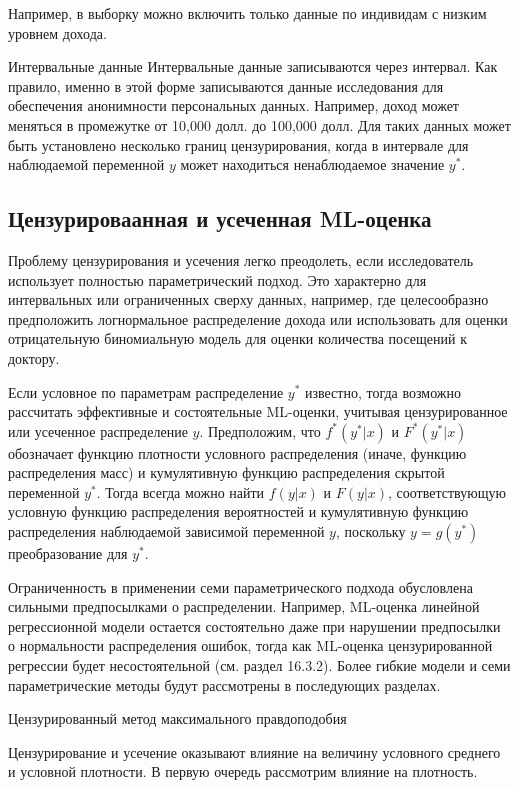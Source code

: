 Например, в выборку можно включить только данные по индивидам с низким уровнем дохода.

Интервальные данные
Интервальные данные записываются через интервал. Как правило, именно в этой форме записываются данные исследования для обеспечения анонимности персональных данных. Например, доход может меняться в промежутке от 10,000 долл. до 100,000 долл. Для таких данных может быть установлено несколько границ цензурирования, когда в интервале для наблюдаемой переменной $y$ может находиться ненаблюдаемое значение $y^{*}$. 

\subsection{Цензурироваанная и усеченная ML-оценка}

Проблему цензурирования и усечения легко преодолеть, если исследователь использует полностью параметрический подход. Это характерно для интервальных или ограниченных сверху данных, например, где целесообразно предположить логнормальное распределение дохода или использовать для оценки отрицательную биномиальную модель для оценки количества посещений к доктору.

Если условное по параметрам распределение $y^{*}$ известно, тогда возможно рассчитать эффективные и состоятельные ML-оценки, учитывая цензурированное или усеченное распределение $y$. Предположим, что $f^{*}(y^{*}|x)$ и $F^{*}(y^{*}|x)$ обозначает функцию плотности условного распределения (иначе, функцию распределения масс) и кумулятивную функцию распределения скрытой переменной $y^{*}$. Тогда всегда можно найти $f(y|x)$ и $F(y|x)$, соответствующую условную функцию распределения вероятностей и кумулятивную функцию распределения наблюдаемой зависимой переменной $y$, поскольку $y=g(y^{*})$ преобразование для $y^{*}$.

Ограниченность в применении семи параметрического подхода обусловлена сильными предпосылками о распределении. Например, ML-оценка линейной регрессионной модели остается состоятельно даже при нарушении предпосылки о нормальности распределения ошибок, тогда как ML-оценка цензурированной регрессии будет несостоятельной (см. раздел 16.3.2). Более гибкие модели и семи параметрические методы будут рассмотрены в последующих разделах. 


Цензурированный метод максимального правдоподобия


Цензурирование и усечение оказывают влияние на величину условного среднего и условной плотности. В первую очередь рассмотрим влияние на плотность.


